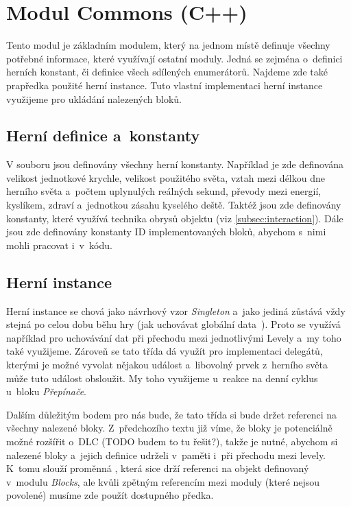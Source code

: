 
\section{Modul Commons (C++)}

Tento modul je základním modulem, který na jednom místě definuje všechny potřebné informace, které využívají ostatní moduly. Jedná se zejména o~definici herních konstant, či definice všech sdílených enumerátorů. Najdeme zde také prapředka použité herní instance. Tuto vlastní implementaci herní instance využijeme pro ukládání nalezených bloků.

\subsection{Herní definice a~konstanty}



V souboru jsou definovány všechny herní konstanty. Například je zde definována velikost jednotkové krychle, velikost použitého světa, vztah mezi délkou dne herního světa a~počtem uplynulých reálných sekund, převody mezi energií, kyslíkem, zdraví a~jednotkou zásahu kyselého deště. Taktéž jsou zde definovány konstanty, které využívá technika obrysů objektu (viz \ref{subsec:interaction}). Dále jsou zde definovány konstanty ID implementovaných bloků, abychom s~nimi mohli pracovat i~v~kódu.

\subsection{Herní instance}

Herní instance  se chová jako návrhový vzor \textit{Singleton} a~jako jediná zůstává vždy stejná po celou dobu běhu hry (jak uchovávat globální data~\citep{ue_gameInstance}). Proto se využívá například pro uchovávání dat při přechodu mezi jednotlivými Levely a~my toho také využijeme. Zároveň se tato třída dá využít pro implementaci delegátů, kterými je možné vyvolat nějakou událost a~libovolný prvek z~herního světa může tuto událost obsloužit. My toho využijeme u~reakce na denní cyklus u~bloku \textit{Přepínače}.

Dalším důležitým bodem pro nás bude, že tato třída si bude držet referenci na všechny nalezené bloky. Z~předchozího textu již víme, že bloky je potenciálně možné rozšířit o~DLC (TODO budem to tu řešit?), takže je nutné, abychom si nalezené bloky a~jejich definice udrželi v~paměti i~při přechodu mezi levely. K~tomu slouží proměnná , která sice drží referenci na objekt definovaný v~modulu \textit{Blocks}, ale kvůli zpětným referencím mezi moduly (které nejsou povolené) musíme zde použít dostupného předka.

